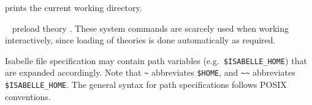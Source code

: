 \begin{isabellebody}
\begin{isamarkuptext}
\begin{description}
  \item \hyperlink{command.pwd}{\mbox{}} prints the current working directory.

  \item \hyperlink{command.use-thy}{\mbox{}}~ preload theory .
  These system commands are scarcely used when working interactively,
  since loading of theories is done automatically as required.

  \end{description}

  Isabelle file specification may contain path variables (e.g.\
  \verb|$ISABELLE_HOME|) that are expanded accordingly.  Note
  that \verb|~| abbreviates \verb|$HOME|, and \verb|~~| abbreviates \verb|$ISABELLE_HOME|.  The general syntax
  for path specifications follows POSIX conventions.%
\end{isamarkuptext}%
\isamarkuptrue%
%
\isadelimtheory
%
\endisadelimtheory
%
\isatagtheory
{}\isamarkupfalse%
%
\endisatagtheory
{\isafoldtheory}%
%
\isadelimtheory
%
\endisadelimtheory
\isanewline
\end{isabellebody}%
